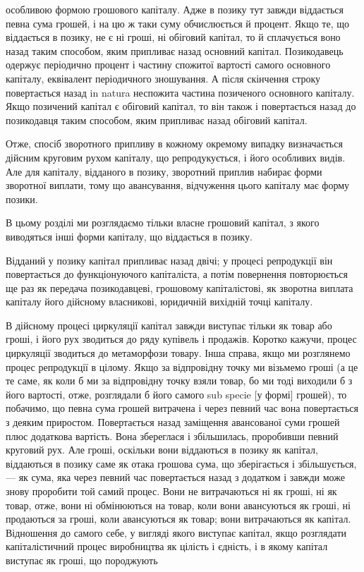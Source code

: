 \parcont{}  %
особливою формою грошового капіталу. Адже в позику тут
завжди віддається певна сума грошей, і на цю ж таки суму обчислюється
й процент. Якщо те, що віддається в позику, не є ні
гроші, ні обіговий капітал, то й сплачується воно назад таким
способом, яким припливає назад основний капітал. Позикодавець
одержує періодично процент і частину спожитої вартості самого
основного капіталу, еквівалент періодичного зношування.
А після скінчення строку повертається назад in natura неспожита
частина позиченого основного капіталу. Якщо позичений
капітал є обіговий капітал, то він також і повертається назад
до позикодавця таким способом, яким припливає назад обіговий
капітал.

Отже, спосіб зворотного припливу в кожному окремому випадку
визначається дійсним круговим рухом капіталу, що репродукується,
і його особливих видів. Але для капіталу, відданого
в позику, зворотний приплив набирає форми зворотної виплати,
тому що авансування, відчуження цього капіталу має
форму позики.

В цьому розділі ми розглядаємо тільки власне грошовий капітал,
з якого виводяться інші форми капіталу, що віддається
в позику.

Відданий у позику капітал припливає назад двічі; у процесі
репродукції він повертається до функціонуючого капіталіста, а
потім повернення повторюється ще раз як передача позикодавцеві,
грошовому капіталістові, як зворотна виплата капіталу
його дійсному власникові, юридичній вихідній точці капіталу.

В дійсному процесі циркуляції капітал завжди виступає тільки
як товар або гроші, і його рух зводиться до ряду купівель і
продажів. Коротко кажучи, процес циркуляції зводиться до метаморфози
товару. Інша справа, якщо ми розглянемо процес репродукції
в цілому. Якщо за відпровідну точку ми візьмемо гроші
(а це те саме, як коли б ми за відпровідну точку взяли товар, бо ми
тоді виходили б з його вартості, отже, розглядали б його самого
sub specie [у формі] грошей), то побачимо, що певна сума
грошей витрачена і через певний час вона повертається з деяким
приростом. Повертається назад заміщення авансованої
суми грошей плюс додаткова вартість. Вона збереглася і збільшилась,
проробивши певний круговий рух. Але гроші, оскільки
вони віддаються в позику як капітал, віддаються в позику саме
як отака грошова сума, що зберігається і збільшується, — як
сума, яка через певний час повертається назад з додатком
і завжди може знову проробити той самий процес. Вони не витрачаються
ні як гроші, ні як товар, отже, вони ні обмінюються
на товар, коли вони авансуються як гроші, ні продаються за
гроші, коли авансуються як товар; вони витрачаються як капітал.
Відношення до самого себе, у вигляді якого виступає капітал,
якщо розглядати капіталістичний процес виробництва як цілість
і єдність, і в якому капітал виступає як гроші, що породжують
\parbreak{}  %

